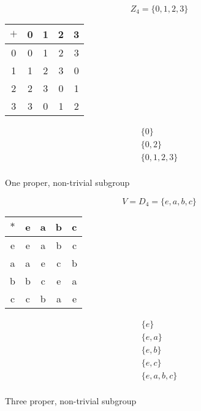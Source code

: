 \documentclass[letterpaper,12pt,fleqn]{article}
\begin{document}
\begin{example}
  \begin{minipage}[t]{3in}
    \listbreak 
    \[Z_4=\{0,1,2,3\}\]
  
    \begin{tabular}{c|cccc}
      $+$ & 0 & 1 & 2 & 3 \\
      \hline
      0 & 0 & 1 & 2 & 3 \\
      1 & 1 & 2 & 3 & 0 \\
      2 & 2 & 3 & 0 & 1 \\
      3 & 3 & 0 & 1 & 2 \\
    \end{tabular}

    \[\begin{array}{l}
    \{0\} \\
    \{0,2\} \\
    \{0,1,2,3\} \\
    \end{array}\]

    One proper, non-trivial subgroup
  \end{minipage}
  \begin{minipage}[t]{3in}
    \listbreak
    \[V=D_4=\{e,a,b,c\}\]
  
    \begin{tabular}{c|cccc}
      $*$ & e & a & b & c \\
      \hline
      e & e & a & b & c \\
      a & a & e & c & b \\
      b & b & c & e & a \\
      c & c & b & a & e \\
    \end{tabular}

    \[\begin{array}{l}
    \{e\} \\
    \{e,a\} \\
    \{e,b\} \\
    \{e,c\} \\
    \{e,a,b,c\} \\
    \end{array}\]

    Three proper, non-trivial subgroup
  \end{minipage}

  \bigskip


\end{example}
\end{document}
